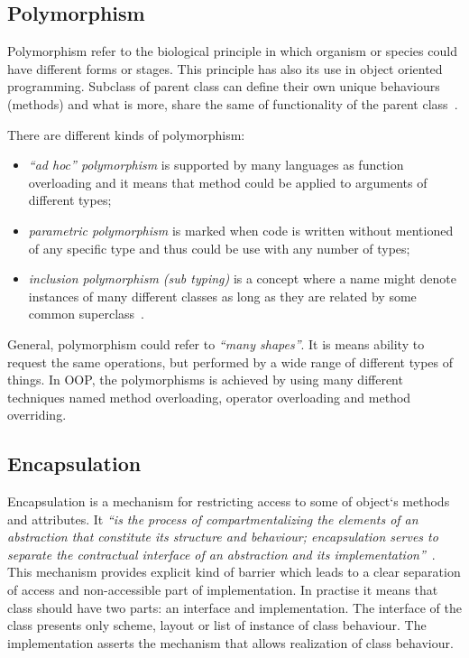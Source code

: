 \subsection*{Polymorphism}
Polymorphism refer to the biological principle in which organism or species could have different forms or stages. This principle has also its use in object oriented programming. Subclass of parent class can define their own unique behaviours (methods) and what is more, share the same of functionality of the parent class~\cite{JavaDoc}.

There are different kinds of polymorphism:
\begin{itemize}
\item \textit{``ad hoc'' polymorphism} is supported by many languages as function overloading and it means that method could be applied to arguments of different types;
\item \textit{parametric polymorphism} is marked when code is written without mentioned of any specific type and thus could be use with any number of types;
\item\textit{inclusion polymorphism (sub typing)} is a concept where a name might denote instances of many different classes as long as they are related by some common superclass~\cite{booch}.
\end{itemize}

General, polymorphism could refer to \textit{``many shapes''}. It is means ability to request the same operations, but performed by a wide range of different types of things. In OOP, the polymorphisms is achieved by using many different techniques named method overloading, operator overloading and method overriding.

\subsection*{Encapsulation}
Encapsulation is a mechanism for restricting access to some of object`s methods and attributes. It \textit{``is the process of compartmentalizing the elements of an abstraction that constitute
its structure and behaviour; encapsulation serves to separate the contractual interface of an
abstraction and its implementation''}~\cite{booch}.
This mechanism provides explicit kind of barrier which leads to a clear separation of access and non-accessible part of implementation. In practise it means that class should have two parts: an interface and implementation. The interface of the class presents only scheme, layout or list of instance of class behaviour. The implementation asserts the mechanism that allows realization of class behaviour. 

